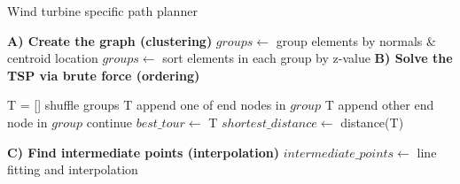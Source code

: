 \documentclass[letterpaper, 10 pt, conference]{ieeeconf}  %
\begin{document}
\begin{algorithm} 
\caption{Wind turbine specific path planner}
\label{alg:1}
\begin{algorithmic}
   \State \textbf{A) Create the graph (clustering)}
   \State $groups \leftarrow$ group elements by normals $\&$ centroid location
   \State $groups \leftarrow$ sort elements in each group by z-value
\State \textbf{B) Solve the TSP via brute force (ordering)}
   
   

   
        \State T = []
        \State shuffle groups
        \State		T append one of end nodes in $group$
		\State	T append other end node in $group$
		\EndFor
		\State  continue
		\EndIf
            \State $best\_tour \leftarrow$ T 
            \State $shortest\_distance \leftarrow$ distance(T)
        \EndIf
    \EndWhile


    \State \textbf{C) Find intermediate points (interpolation)}
    \State $intermediate\_points \leftarrow$ line fitting and interpolation 
    
\end{algorithmic}

\end{algorithm}





\end{document}
